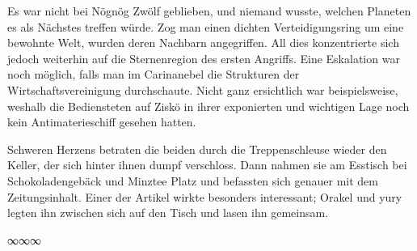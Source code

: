 Es war nicht bei Nögnög Zwölf geblieben, und niemand wusste, welchen Planeten es als Nächstes treffen würde. Zog man einen dichten Verteidigungsring um eine bewohnte Welt, wurden deren Nachbarn angegriffen. All dies konzentrierte sich jedoch weiterhin auf die Sternenregion des ersten Angriffs. Eine Eskalation war noch möglich, falls man im Carinanebel die Strukturen der Wirtschaftsvereinigung durchschaute. Nicht ganz ersichtlich war beispielsweise, weshalb die Bediensteten auf Ziskö in ihrer exponierten und wichtigen Lage noch kein Antimaterieschiff gesehen hatten.

Schweren Herzens betraten die beiden durch die Treppenschleuse wieder den Keller, der sich hinter ihnen dumpf verschloss. Dann nahmen sie am Esstisch bei Schokoladengebäck und Minztee Platz und befassten sich genauer mit dem Zeitungsinhalt. Einer der Artikel wirkte besonders interessant; Orakel und yury legten ihn zwischen sich auf den Tisch und lasen ihn gemeinsam.

\begin{center}
∞∞∞
\end{center}

